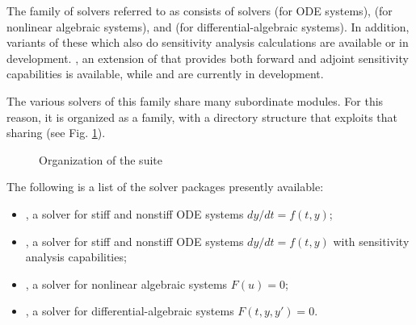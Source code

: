 %
The family of solvers referred to as {\sundials} consists of solvers
{\cvode} (for ODE systems), {\kinsol} (for nonlinear algebraic
systems), and {\ida} (for differential-algebraic systems).  In addition,
variants of these which also do sensitivity analysis calculations are
available or in development. {\cvodes}, an extension of {\cvode} that
provides both forward and adjoint sensitivity capabilities is available,
while {\idas} and {\kinsols} are currently in development.

The various solvers of this family share many subordinate modules.
For this reason, it is organized as a family, with a directory
structure that exploits that sharing (see Fig. \ref{f:sunorg}).
\begin{figure}
\centerline{}
\caption {Organization of the {\sundials} suite}\label{f:sunorg}
\end{figure}
The following is a list of the solver packages presently available:
\begin{itemize}

\item {\cvode},  
  a solver for stiff and nonstiff ODE systems $dy/dt = f(t,y)$;

\item {\cvodes},
  a solver for stiff and nonstiff ODE systems $dy/dt = f(t,y)$
  with sensitivity analysis capabilities;

\item {\kinsol}, 
  a solver for nonlinear algebraic systems $F(u) = 0$;

\item {\ida},
  a solver for differential-algebraic systems $F(t,y,y') = 0$.

\end{itemize}